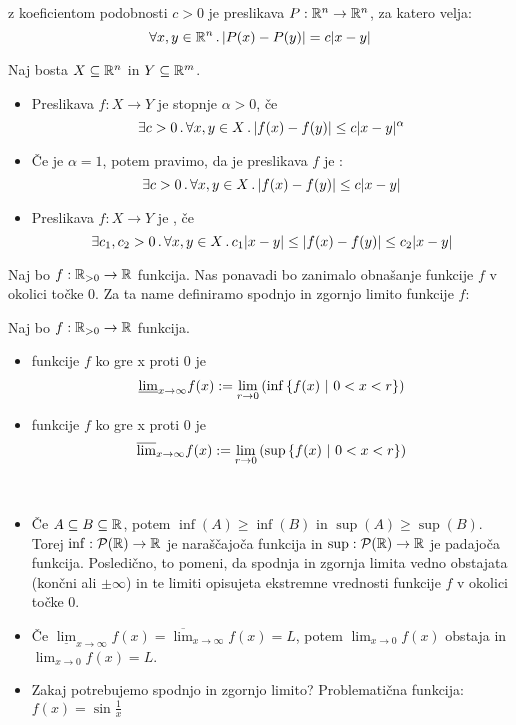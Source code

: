 \begin{definicija}
     z koeficientom podobnosti \(c > 0\) je preslikava \(P: \mathbb{R}^n \to \mathbb{R}^n\), za katero velja:
    \[\forall x, y \in \mathbb{R}^n \,.\, |P(x) - P(y)| = c|x-y|\]
\end{definicija}

\begin{definicija} Naj bosta \(X \subseteq \mathbb{R}^n\) in \(Y \subseteq \mathbb{R}^m\).
    \begin{itemize}
        \item Preslikava \(f: X \to Y\) je  stopnje \(\alpha > 0\), če
        \[\exists c > 0 \,.\, \forall x, y \in X \,.\, |f(x) -f(y)| \leq c|x-y|^\alpha\]
        \item Če je \(\alpha = 1\), potem pravimo, da je preslikava \(f\) je :
        \[\exists c > 0 \,.\, \forall x, y \in X \,.\, |f(x) -f(y)| \leq c|x-y|\]
        \item Preslikava \(f: X \to Y\) je , če 
        \[\exists c_1, c_2 > 0 \,.\, \forall x, y \in X \,.\, c_1 |x- y| \leq |f(x) - f(y)| \leq c_2 |x - y|\]
    \end{itemize}    
\end{definicija}

Naj bo \(f: \mathbb{R}_{>0} \to \mathbb{R}\) funkcija. Nas ponavadi bo zanimalo obnašanje funkcije \(f\) v okolici točke \(0\). Za ta name definiramo spodnjo in zgornjo limito funkcije \(f\):
\begin{definicija}
    Naj bo \(f: \mathbb{R}_{>0} \to \mathbb{R}\) funkcija. 
    \begin{itemize}
        \item {} funkcije \(f\) ko gre x proti \(0\) je 
        \[\underline{\lim}_{x \to \infty} f(x) := \lim_{r \to 0} \left(\inf \left\{f(x) \ | \ 0< x < r\right\}\right)\]
        \item {} funkcije \(f\) ko gre x proti \(0\) je 
        \[\overline{\lim}_{x \to \infty} f(x) := \lim_{r \to 0} \left(\sup \left\{f(x) \ | \ 0< x < r\right\}\right)\]
    \end{itemize}
\end{definicija}

\begin{opomba} \
    \begin{itemize}
        \item Če \(A \subseteq B \subseteq \mathbb{R}\), potem \(\inf(A) \geq \inf(B)\) in \(\sup(A) \geq \sup(B)\). Torej \(\inf: \mathcal{P}(\mathbb{R}) \to \mathbb{R}\) je naraščajoča funkcija in \(\sup: \mathcal{P}(\mathbb{R}) \to \mathbb{R}\) je padajoča funkcija. Posledično, to pomeni, da spodnja in zgornja limita vedno obstajata (končni ali \(\pm \infty\)) in te limiti opisujeta ekstremne vrednosti funkcije \(f\) v okolici točke \(0\).
        \item Če \(\underline{\lim}_{x \to \infty} f(x) = \overline{\lim}_{x \to \infty} f(x) = L\), potem \(\lim_{x \to 0} f(x)\) obstaja in \(\lim_{x \to 0} f(x) = L\).
        \item Zakaj potrebujemo spodnjo in zgornjo limito? Problematična funkcija: \(f(x) = \sin \frac{1}{x}\)
    \end{itemize}
\end{opomba}

